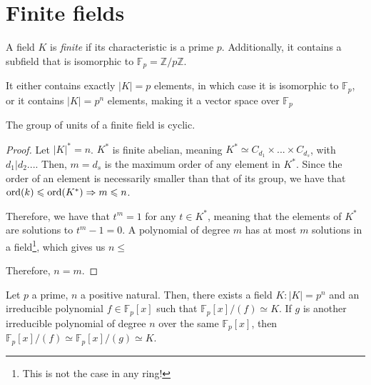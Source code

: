 \section{Finite fields}
\begin{theorem*}
  A field $K$ is \emph{finite} if its characteristic is a prime $p$. Additionally, it contains a subfield that is isomorphic to $\mathbb{F}_p = \mathbb{Z}/p\mathbb{Z}$. 
  
  It either contains exactly $|K| = p$ elements, in which case it is isomorphic to $\mathbb{F}_p$, or it contains $|K| = p^n$ elements, making it a vector space over $\mathbb{F}_p$
\end{theorem*}
\begin{theorem*}
  The group of units of a finite field is cyclic. 
\end{theorem*}
\begin{proof}
  Let $|K|^* = n$. $K^*$ is finite abelian, meaning $K^* \simeq C_{d_1} \times ... \times C_{d_s}$, with $d_1 | d_2 ...$. Then, $m = d_s$ is the maximum order of any element in $K^*$. Since the order of an element is necessarily smaller than that of its group, we have that $\operatorname{ord}(k) \leqslant \operatorname{ord}(K^*) \Rightarrow m \leqslant n$. 

  Therefore, we have that $t^m = 1$ for any $t \in K^*$, meaning that the elements of $K^*$ are solutions to $t^m - 1 = 0$. A polynomial of degree $m$ has at most $m$ solutions in a field\footnote{This is not the case in any ring!}, which gives us $n \leqslant$
  
  Therefore, $n = m$. 
\end{proof}

\begin{theorem}
  Let $p$ a prime, $n$ a positive natural. Then, there exists a field $K: |K| = p^n$ and an irreducible polynomial $f \in \mathbb{F}_p[x]$ such that $\mathbb{F}_p[x]/(f) \simeq K$. If $g$ is another irreducible polynomial of degree $n$ over the same $\mathbb{F}_p[x]$, then $\mathbb{F}_p[x]/(f) \simeq \mathbb{F}_p[x]/(g) \simeq K$. 
\end{theorem}

